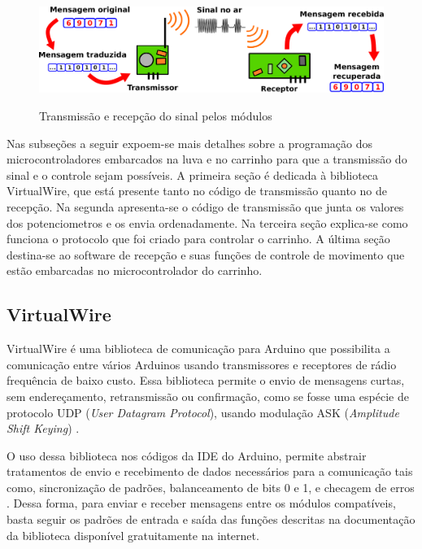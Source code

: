 \documentclass[
	12pt,				%
	openright,			%
	oneside,			%
	a4paper,			%
	english,			%
	brazil				%
	]{abntex2}
\begin{document}
		\begin{figure}[h!]
			\centering
			\caption{Transmissão e recepção do sinal pelos módulos}
  		\includegraphics[width=14cm]{./figures/tx-rx-scheme1.png}
  		\label{Fig:tx-rx-scheme1}
		\end{figure}

		Nas subseções a seguir expoem-se mais detalhes sobre a programação dos microcontroladores embarcados na luva e no carrinho para que a transmissão do sinal e o controle sejam possíveis. A primeira seção é dedicada à biblioteca VirtualWire, que está presente tanto no código de transmissão quanto no de recepção. Na segunda apresenta-se o código de transmissão que junta os valores dos potenciometros e os envia ordenadamente. Na terceira seção explica-se como funciona o protocolo que foi criado para controlar o carrinho. A última seção destina-se ao software de recepção e suas funções de controle de movimento que estão embarcadas no microcontrolador do carrinho.


		\subsection{VirtualWire}


		VirtualWire é uma biblioteca de comunicação para Arduino que possibilita a comunicação entre vários Arduinos usando transmissores e receptores de rádio frequência de baixo custo. Essa biblioteca permite o envio de mensagens curtas, sem endereçamento, retransmissão ou confirmação, como se fosse uma espécie de protocolo UDP (\textit{User Datagram Protocol}), usando modulação ASK (\textit{Amplitude Shift Keying}) \cite{virtualwiremanual}. 

		O uso dessa biblioteca nos códigos da IDE do Arduino, permite abstrair tratamentos de envio e recebimento de dados necessários para a comunicação tais como, sincronização de padrões, balanceamento de bits 0 e 1, e checagem de erros \cite{virtualwirepjrc}. Dessa forma, para enviar e receber mensagens entre os módulos compatíveis, basta seguir os padrões de entrada e saída das funções descritas na documentação da biblioteca disponível gratuitamente na internet.
\end{document}
